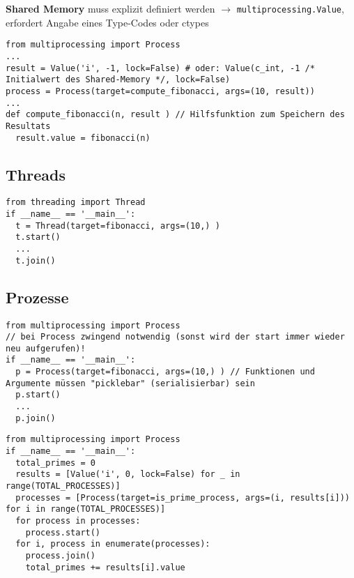 \textbf{Shared Memory} muss explizit definiert werden $\rightarrow$ \lstinline{multiprocessing.Value}, erfordert Angabe eines Type-Codes oder ctypes

\begin{lstlisting}
from multiprocessing import Process
...
result = Value('i', -1, lock=False) # oder: Value(c_int, -1 /* Initialwert des Shared-Memory */, lock=False)
process = Process(target=compute_fibonacci, args=(10, result))
...
def compute_fibonacci(n, result ) // Hilfsfunktion zum Speichern des Resultats
  result.value = fibonacci(n)
\end{lstlisting}


\subsection{Threads}

\begin{lstlisting}
from threading import Thread
if __name__ == '__main__':
  t = Thread(target=fibonacci, args=(10,) )
  t.start()
  ...
  t.join()
\end{lstlisting}

\subsection{Prozesse}

\begin{minipage}[t]{0.5\linewidth}
    \begin{lstlisting}
from multiprocessing import Process
// bei Process zwingend notwendig (sonst wird der start immer wieder neu aufgerufen)!
if __name__ == '__main__':
  p = Process(target=fibonacci, args=(10,) ) // Funktionen und Argumente müssen "picklebar" (serialisierbar) sein
  p.start()
  ...
  p.join()
    \end{lstlisting}
\end{minipage}
\begin{minipage}[t]{0.48\linewidth}
    \begin{lstlisting}
from multiprocessing import Process
if __name__ == '__main__':
  total_primes = 0
  results = [Value('i', 0, lock=False) for _ in range(TOTAL_PROCESSES)]
  processes = [Process(target=is_prime_process, args=(i, results[i])) for i in range(TOTAL_PROCESSES)]
  for process in processes:
    process.start()
  for i, process in enumerate(processes):
    process.join()
    total_primes += results[i].value
    \end{lstlisting}
\end{minipage}


